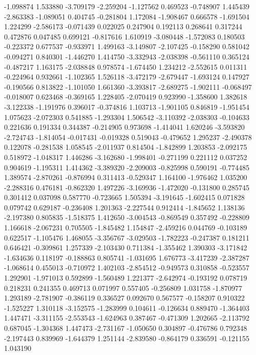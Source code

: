 -1.098874
1.533880
-3.709179
-2.259204
-1.127562
0.469523
-0.748907
1.445439
-2.863383
-1.089051
0.404745
-0.281804
1.172084
-1.908467
0.666578
-1.691504
1.224299
-2.586173
-0.071439
0.022025
0.247904
0.192113
0.268641
0.317244
0.472876
0.047485
0.699121
-0.817616
1.610919
-3.080448
-1.572083
0.180503
-0.223372
0.677537
-0.933971
1.499163
-3.149807
-2.107425
-0.158290
0.581042
-0.094271
0.840301
-1.446270
1.414750
-3.332943
-2.038398
-0.561110
0.365124
-0.487217
1.163175
-2.038848
0.978574
-1.674450
1.234212
-2.552615
0.011311
-0.224964
0.932661
-1.102365
1.526118
-3.472179
-2.679447
-1.693124
0.147927
-0.190566
0.813822
-1.101050
1.661360
-3.393817
-2.689275
-1.902111
-0.068497
-0.018007
0.623468
-0.369165
1.228405
-2.070419
0.923990
-1.358600
1.382618
-3.122338
-1.191976
0.396017
-0.374816
1.103713
-1.901105
0.846819
-1.951454
1.075623
-2.072303
0.541885
-1.293304
1.506542
-3.110392
-2.038303
-0.104633
0.221636
0.191334
0.344387
-0.214905
0.973698
-1.414041
1.620246
-3.593820
-2.724743
-1.814054
-0.017431
-0.019328
0.519043
-0.479652
1.295237
-2.490378
0.122078
-0.281538
1.058545
-2.011937
0.814504
-1.842899
1.203853
-2.092175
0.518972
-1.048317
1.446286
-3.162680
-1.998401
-0.271199
0.221112
0.037252
0.904619
-1.195311
1.414362
-3.389320
-2.209003
-0.825998
0.590191
-0.774485
1.389574
-2.870261
-0.876994
0.311413
-0.529347
1.164100
-1.976462
1.035200
-2.288316
0.476181
-0.862320
1.497226
-3.169936
-1.472020
-0.131800
0.285745
0.301412
0.037098
0.587770
-0.723665
1.505394
-3.191645
-1.602415
0.071828
0.079742
0.629187
-0.236408
1.201363
-2.227544
0.912414
-1.845652
1.138136
-2.197380
0.805835
-1.518375
1.412650
-3.004543
-0.869549
0.357492
-0.228809
1.166618
-2.067231
0.705505
-1.845482
1.154847
-2.459216
0.044769
-0.103189
0.622517
-1.105476
1.468055
-3.356767
-3.029503
-1.782223
-0.247387
0.181211
0.646421
-0.309861
1.257339
-2.103430
0.711384
-1.355462
1.390303
-3.171842
-1.634636
0.118197
-0.188863
0.805741
-1.031695
1.676773
-3.417239
-2.387287
-1.068614
0.455013
-0.710972
1.402103
-2.854512
-0.949573
0.310858
-0.523557
1.292901
-1.971013
0.592899
-1.560489
1.221377
-2.642974
-0.193192
0.078719
0.218231
0.241355
0.469713
0.071997
0.557405
-0.256809
1.031758
-1.870977
1.293189
-2.781907
-0.386119
0.336527
0.092670
0.567577
-0.158207
0.910322
-1.525227
1.310118
-3.152575
-1.283999
0.104611
-0.126634
0.889470
-1.364403
1.447471
-3.311155
-2.553543
-1.624963
0.387467
-0.471309
1.202665
-2.113792
0.687045
-1.304368
1.447473
-2.731167
-1.050650
0.304897
-0.476786
0.792348
-2.197443
0.839969
-1.644379
1.251144
-2.839580
-0.864179
0.336591
-0.121155
1.043190
